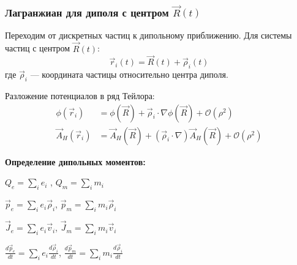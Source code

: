 \documentclass[a4paper,10pt]{article}
\newcommand{\modblock}[1]{\colorbox{modcolor!10}{\parbox{\dimexpr\linewidth-2\fboxsep}{#1}}}
\begin{document}
\modblock{

\subsubsection{Лагранжиан для диполя с центром $\vec{R}(t)$}

Переходим от дискретных частиц к дипольному приближению. Для системы частиц с центром $\vec{R}(t)$:
\begin{equation}
\vec{r}_i(t) = \vec{R}(t) + \vec{\rho}_i(t)
\label{eq:dipole_decomposition}
\end{equation}
где $\vec{\rho}_i$ --- координата частицы относительно центра диполя.

Разложение потенциалов в ряд Тейлора:
\begin{align}
\phi(\vec{r}_i) &= \phi(\vec{R}) + \vec{\rho}_i \cdot \nabla\phi(\vec{R}) + \mathcal{O}(\rho^2) \\
\vec{A}_H(\vec{r}_i) &= \vec{A}_H(\vec{R}) + (\vec{\rho}_i \cdot \nabla)\vec{A}_H(\vec{R}) + \mathcal{O}(\rho^2)
\end{align}

} %

\modblock{

\textbf{Определение дипольных моментов:}


$Q_e = \sum_i e_i$ , $Q_m = \sum_i m_i$

$\vec{p}_e = \sum_i e_i \vec{\rho}_i$, $\vec{p}_m = \sum_i m_i \vec{\rho}_i$ 

$\vec{J}_e = \sum_i e_i \vec{v}_i$, $\vec{J}_m = \sum_i m_i \vec{v}_i$

$\frac{d\vec{p}_e}{dt} = \sum_i e_i \frac{d\vec{\rho}_i}{dt}$, $\frac{d\vec{p}_m}{dt} = \sum_i m_i \frac{d\vec{\rho}_i}{dt}$


} %
\end{document}
